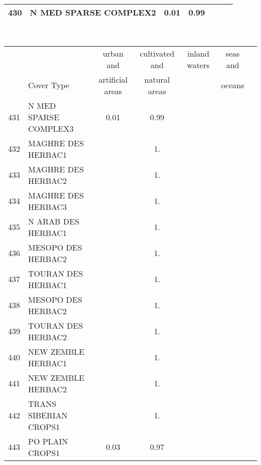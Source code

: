 {{\begin{tabular}{||r|l||c|c|c|c|c||}
 \hline
         430  & N MED SPARSE COMPLEX2                                        &  0.01 &  0.99 &       &       \\
 \hline
 \end{tabular}
 \clearpage
 \medskip\
 \begin{tabular}{||r|l||c|c|c|c|c||}
 \hline
 \hline
 && urban and & cultivated and &inland waters&seas and\\
 &Cover Type& artificial areas & natural areas&&oceans\\
 \hline
 \hline
         431  & N MED SPARSE COMPLEX3                                        &  0.01 &  0.99 &       &       \\
 \hline
         432  & MAGHRE DES HERBAC1                                           &       &  1.   &       &       \\
 \hline
         433  & MAGHRE DES HERBAC2                                           &       &  1.   &       &       \\
 \hline
         434  & MAGHRE DES HERBAC3                                           &       &  1.   &       &       \\
 \hline
         435  & N ARAB DES HERBAC1                                           &       &  1.   &       &       \\
 \hline
         436  & MESOPO DES HERBAC2                                           &       &  1.   &       &       \\
 \hline
         437  & TOURAN DES HERBAC1                                           &       &  1.   &       &       \\
 \hline
         438  & MESOPO DES HERBAC2                                           &       &  1.   &       &       \\
 \hline
         439  & TOURAN DES HERBAC2                                           &       &  1.   &       &       \\
 \hline
         440  & NEW ZEMBLE HERBAC1                                           &       &  1.   &       &       \\
 \hline
         441  & NEW ZEMBLE HERBAC2                                           &       &  1.   &       &       \\
 \hline
         442  & TRANS SIBERIAN CROPS1                                        &       &  1.   &       &       \\
 \hline
         443  & PO PLAIN CROPS1                                              &  0.03 &  0.97 &       &       \\

\end{tabular}}}
